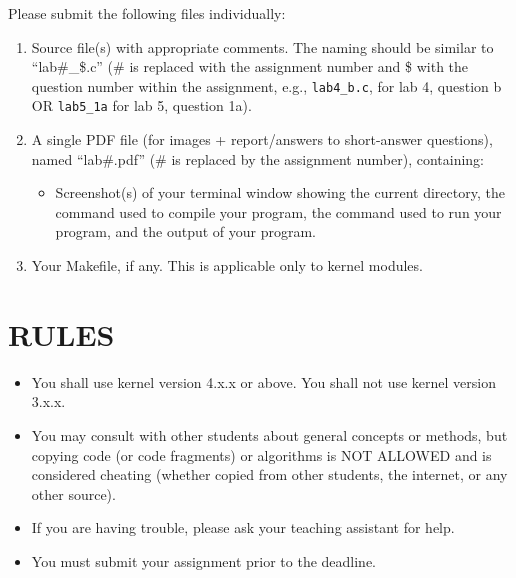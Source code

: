 \documentclass{article}
\begin{document}
Please submit the following files individually:

\begin{enumerate}
    \item Source file(s) with appropriate comments. The naming should be similar to “lab\#\_\$.c” (\# is replaced with the assignment number and \$ with the question number within the assignment, e.g., \texttt{lab4\_b.c}, for lab 4, question b OR \texttt{lab5\_1a} for lab 5, question 1a).
    \item A single PDF file (for images + report/answers to short-answer questions), named “lab\#.pdf” (\# is replaced by the assignment number), containing:
    \begin{itemize}
        \item Screenshot(s) of your terminal window showing the current directory, the command used to compile your program, the command used to run your program, and the output of your program.
    \end{itemize}
    \item Your Makefile, if any. This is applicable only to kernel modules.
\end{enumerate}

\section*{RULES}

\begin{itemize}
    \item You shall use kernel version 4.x.x or above. You shall not use kernel version 3.x.x.
    \item You may consult with other students about general concepts or methods, but copying code (or code fragments) or algorithms is NOT ALLOWED and is considered cheating (whether copied from other students, the internet, or any other source).
    \item If you are having trouble, please ask your teaching assistant for help.
    \item You must submit your assignment prior to the deadline.
\end{itemize}
\end{document}

